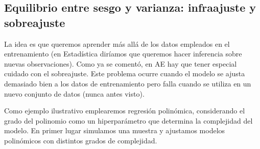 \documentclass[]{book}
\theoremstyle{break}
\theoremstyle{definition}
\theoremstyle{definition}
\theoremstyle{definition}
\theoremstyle{remark}
\begin{document}
\subsection{Equilibrio entre sesgo y varianza: infraajuste y
sobreajuste}\label{bias-variance}

La idea es que queremos aprender más allá de los datos empleados en el
entrenamiento (en Estadística diríamos que queremos hacer inferencia
sobre nuevas observaciones). Como ya se comentó, en AE hay que tener
especial cuidado con el sobreajuste. Este problema ocurre cuando el
modelo se ajusta demasiado bien a los datos de entrenamiento pero falla
cuando se utiliza en un nuevo conjunto de datos (nunca antes visto).

Como ejemplo ilustrativo emplearemos regresión polinómica, considerando
el grado del polinomio como un hiperparámetro que determina la
complejidad del modelo. En primer lugar simulamos una muestra y
ajustamos modelos polinómicos con distintos grados de complejidad.
\end{document}
